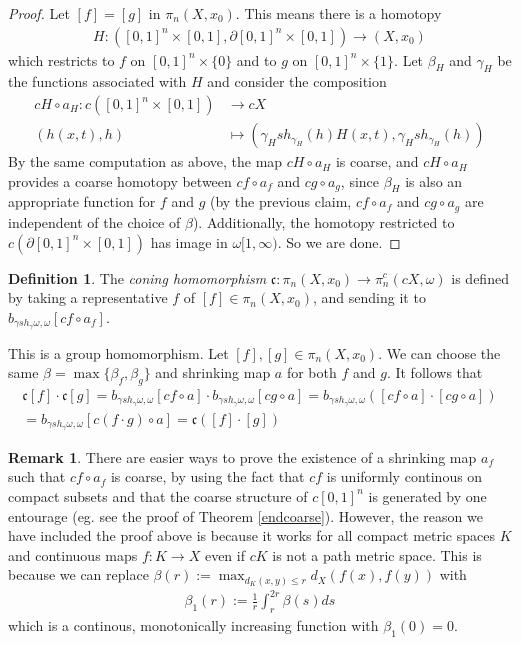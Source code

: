 \documentclass[a4paper,11pt]{article}
\theoremstyle{definition}
\newtheorem{definition}{Definition}[section]
\newtheorem*{remark}{Remark}
\theoremstyle{plain}
\theoremstyle{remark}
\begin{document}
{\begin{proof} Let $[f] =[g]$ in $\pi_{n}(X,x_0)$. This means there is a homotopy
\begin{align*}
H: ([0,1]^n \times [0,1], \partial [0,1]^n \times [0,1]) \rightarrow (X,x_0)
\end{align*}
which restricts to $f$ on $[0,1]^n \times \{0\}$ and to $g$ on $[0,1]^n \times \{1\}$.  Let $\beta_{H}$ and $\gamma_{H}$ be the functions associated with $H$ and consider the composition 
\begin{align*}
cH\circ a_{H}:c([0,1]^n \times [0,1]) &\rightarrow cX\\
(h(x,t), h) &\mapsto (\gamma_{H} sh_{\gamma_{H}}(h) H(x,t), \gamma_{H} sh_{\gamma_{H}} (h))
\end{align*}
By the same computation as above, the map $cH\circ a_{H}$ is coarse, and $cH \circ a_{H}$ provides a coarse homotopy between $cf\circ a_{f}$ and $cg\circ a_{g}$, since $\beta_{H}$ is also an appropriate function for $f$ and $g$ (by the previous claim, $cf \circ a_{f}$ and $cg\circ a_{g}$ are independent of the choice of $\beta$). Additionally, the homotopy restricted to $c(\partial[0,1]^n \times [0,1])$ has image in $\omega[1,\infty)$. So we are done. 
\end{proof}

\begin{definition} The \textit{coning homomorphism} $\mathfrak{c}: \pi_{n}(X,x_0)\rightarrow \pi_{n}^{c}(cX,\omega)$ is defined by taking a representative $f$ of $[f]\in \pi_{n}(X,x_0)$, and sending it to $b_{\gamma sh_{\gamma} \omega,\omega}[cf\circ a_{f}]$. 
\end{definition}

This is a group homomorphism. Let $[f],[g]\in \pi_{n}(X,x_0)$. We can choose the same $\beta = \max\{\beta_{f},\beta_{g}\}$ and shrinking map $a$ for both $f$ and $g$. It follows that 
\begin{align*}
\mathfrak{c}[f]\cdot \mathfrak{c}[g]= b_{\gamma sh_{\gamma} \omega,\omega}[cf\circ a]\cdot b_{\gamma sh_{\gamma} \omega,\omega}[cg\circ a]=b_{\gamma sh_{\gamma} \omega,\omega}([cf\circ a]\cdot[cg\circ a])\\
=b_{\gamma sh_{\gamma} \omega,\omega}[c(f\cdot g)\circ a]
=\mathfrak{c}([f]\cdot [g]) 
\end{align*}

\begin{remark} There are easier ways to prove the existence of a shrinking map $a_{f}$ such that $cf\circ a_{f}$ is coarse, by using the fact that $cf$ is uniformly continous on compact subsets and that the coarse structure of $c[0,1]^n$ is generated by one entourage (eg. see the proof of Theorem \ref{endcoarse}). However, the reason we have included the proof above is because it works for all compact metric spaces $K$ and continuous maps $f:K\rightarrow X$ even if $cK$ is not a path metric space. This is because we can replace $\beta(r) := \max_{d_{K}(x,y)\leq r} d_{X}(f(x),f(y))$ with
\begin{align*}
\beta_1(r):=\frac{1}{r}\int^{2r}_{r} \beta(s)ds 
\end{align*}
which is a continous, monotonically increasing function with $\beta_1(0)=0$.\\


\end{remark}}
\end{document}
